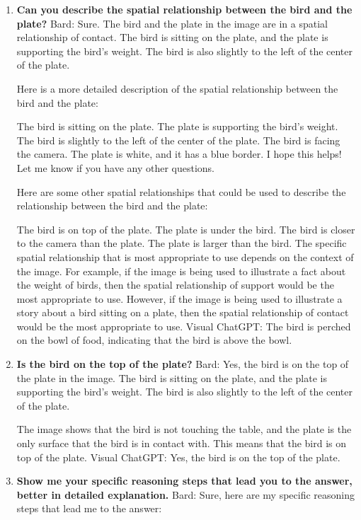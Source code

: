     \begin{enumerate}
        \item \textbf{Can you describe the spatial relationship between the bird and the plate?}
        \subitem Bard:
        Sure. The bird and the plate in the image are in a spatial relationship of contact. The bird is sitting on the plate, and the plate is supporting the bird's weight. The bird is also slightly to the left of the center of the plate.
        
        Here is a more detailed description of the spatial relationship between the bird and the plate:
        
        The bird is sitting on the plate.
        The plate is supporting the bird's weight.
        The bird is slightly to the left of the center of the plate.
        The bird is facing the camera.
        The plate is white, and it has a blue border.
        I hope this helps! Let me know if you have any other questions.
        
        Here are some other spatial relationships that could be used to describe the relationship between the bird and the plate:
        
        The bird is on top of the plate.
        The plate is under the bird.
        The bird is closer to the camera than the plate.
        The plate is larger than the bird.
        The specific spatial relationship that is most appropriate to use depends on the context of the image. For example, if the image is being used to illustrate a fact about the weight of birds, then the spatial relationship of support would be the most appropriate to use. However, if the image is being used to illustrate a story about a bird sitting on a plate, then the spatial relationship of contact would be the most appropriate to use.
        \subitem Visual ChatGPT: The bird is perched on the bowl of food, indicating that the bird is above the bowl.
        \item \textbf{Is the bird on the top of the plate?}
        \subitem Bard: 
        Yes, the bird is on the top of the plate in the image. The bird is sitting on the plate, and the plate is supporting the bird's weight. The bird is also slightly to the left of the center of the plate.
        
        The image shows that the bird is not touching the table, and the plate is the only surface that the bird is in contact with. This means that the bird is on top of the plate.
        \subitem Visual ChatGPT: Yes, the bird is on the top of the plate.
        \item \textbf{Show me your specific reasoning steps that lead you to the answer, better in detailed explanation.}
        \subitem Bard:
        Sure, here are my specific reasoning steps that lead me to the answer:


\end{enumerate}
